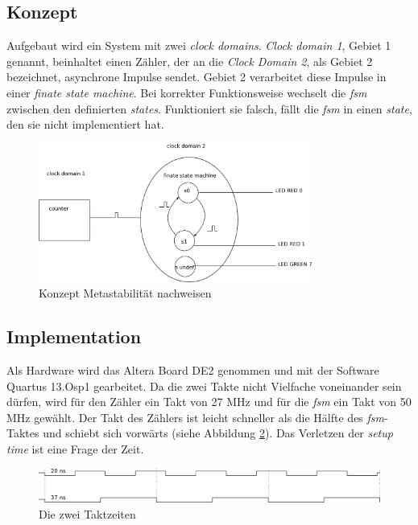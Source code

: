 \subsection{Konzept}\label{sect.metastabil_ansatz}

Aufgebaut wird ein System mit zwei \textit{clock domains}.  \textit{Clock domain 1}, Gebiet 1 genannt,  beinhaltet einen Zähler, der an die \textit{Clock Domain 2}, als Gebiet 2 bezeichnet, asynchrone Impulse sendet. Gebiet 2 verarbeitet diese Impulse in einer \textit{finate state machine}. Bei korrekter Funktionsweise wechselt die \textit{fsm} zwischen den definierten \textit{states}. Funktioniert sie falsch, fällt die \textit{fsm} in einen \textit{state}, den sie nicht implementiert hat.

\begin{figure}[H]
	\includegraphics[width=0.8\textwidth]{images/metastability/konzept.png}
	\caption{Konzept Metastabilität nachweisen}
	\label{fig.metastabil.fsm}
\end{figure}

\subsection{Implementation}\label{sect.metastabil_implementation}

Als Hardware wird das Altera Board DE2 genommen und mit der Software Quartus 13.Osp1 gearbeitet. Da die zwei Takte nicht Vielfache voneinander sein dürfen, wird für den Zähler ein Takt von 27 MHz und für die \textit{fsm} ein Takt von 50 MHz gewählt. Der Takt des Zählers ist leicht schneller als die Hälfte des \textit{fsm}-Taktes und schiebt sich  vorwärts (siehe Abbildung \ref{fig.metastabil.takte}). Das Verletzen der \textit{setup time} ist eine Frage der Zeit.

\begin{figure}[H]
	\includegraphics[width=1\textwidth]{images/metastability/2_takte.png}
	\caption{Die zwei Taktzeiten}
	\label{fig.metastabil.takte}
\end{figure}

